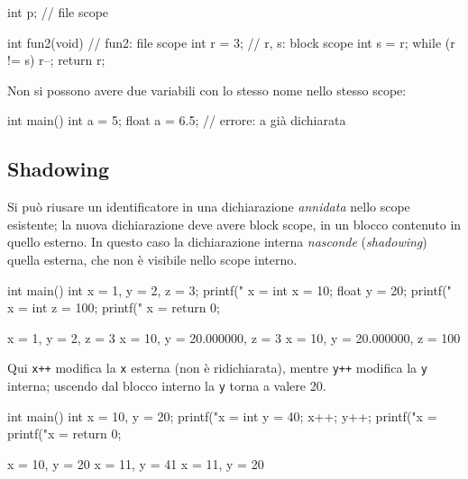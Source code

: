 \documentclass[11pt,a4paper]{article}
\begin{document}
\begin{esempio}
\begin{codice}
int p;                   // file scope

int fun2(void) {         // fun2: file scope
    int r = 3;           // r, s: block scope
    int s = r;
    while (r != s) {
        r--;
    }
    return r;
}
\end{codice}
\end{esempio}

\begin{osservazione}
Non si possono avere due variabili con lo stesso nome nello stesso scope:
\begin{codice}
int main() {
    int a = 5;
    float a = 6.5;   // errore: a già dichiarata
}
\end{codice}
\end{osservazione}

\subsection{Shadowing}

Si può riusare un identificatore in una dichiarazione \emph{annidata} nello
scope esistente; la nuova dichiarazione deve avere block scope, in un blocco
contenuto in quello esterno. In questo caso la dichiarazione interna
\emph{nasconde} (\emph{shadowing}) quella esterna, che non è visibile nello
scope interno.

\begin{esempio}
\begin{codice}
int main() {
    int x = 1, y = 2, z = 3;
    printf(" x = %
    {
        int x = 10;
        float y = 20;
        printf(" x = %
        {
            int z = 100;
            printf(" x = %
        }
    }
    return 0;
}
\end{codice}
\begin{risultato}
x = 1, y = 2, z = 3
x = 10, y = 20.000000, z = 3
x = 10, y = 20.000000, z = 100
\end{risultato}
\end{esempio}

\begin{esempio}
Qui \lstinline|x++| modifica la \lstinline|x| esterna (non è ridichiarata),
mentre \lstinline|y++| modifica la \lstinline|y| interna; uscendo dal blocco
interno la \lstinline|y| torna a valere 20.
\begin{codice}
int main() {
    {
        int x = 10, y = 20;
        {
            printf("x = %
            {
                int y = 40;
                x++;
                y++;
                printf("x = %
            }
            printf("x = %
        }
    }
    return 0;
}
\end{codice}
\begin{risultato}
x = 10, y = 20
x = 11, y = 41
x = 11, y = 20
\end{risultato}
\end{esempio}
\end{document}
